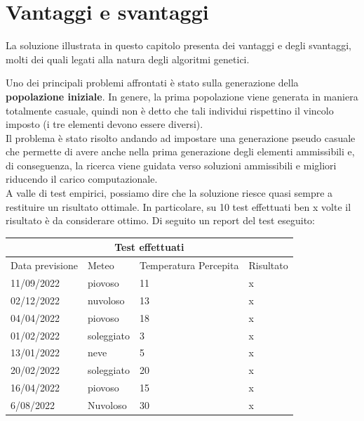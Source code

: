 \documentclass[a4paper, 11pt, oneside]{report}
\begin{document}
            \section{Vantaggi e svantaggi}
            La soluzione illustrata in questo capitolo presenta dei vantaggi e degli svantaggi, molti dei quali legati
            alla natura degli algoritmi genetici.
            \par \noindent Uno dei principali problemi affrontati è stato sulla generazione della \textbf{popolazione iniziale}.
            In genere, la prima popolazione viene generata in maniera totalmente casuale, quindi non è detto che
            tali individui rispettino il vincolo imposto (i tre elementi devono essere diversi).\\
            Il problema è stato risolto andando ad impostare una generazione pseudo casuale che permette
            di avere anche nella prima generazione degli elementi ammissibili e, di conseguenza,
            la ricerca viene guidata verso soluzioni ammissibili e migliori riducendo il carico computazionale.\\
            A valle di test empirici, possiamo dire che la soluzione riesce quasi sempre a restituire un risultato ottimale.
            In particolare, su 10 test effettuati ben x volte il risultato è da considerare ottimo.
            Di seguito un report del test eseguito:
            \begin{center}
                \begin{tabular}{ |p{3cm}|p{2cm}|p{2cm}||p{4cm}|}
                    \hline
                    \multicolumn{4}{|c|}{Test effettuati} \\
                    \hline
                    Data previsione & Meteo & Temperatura Percepita & Risultato\\
                    \hline
                    11/09/2022 & piovoso  & 11 & x\\
                    \hline
                    02/12/2022 & nuvoloso  & 13 & x\\
                    \hline
                    04/04/2022 & piovoso  & 18 & x\\
                    \hline
                    01/02/2022 & soleggiato  & 3 & x\\
                    \hline
                    13/01/2022 & neve  & 5 & x\\
                    \hline
                    20/02/2022 & soleggiato  & 20 & x\\
                    \hline
                    16/04/2022 & piovoso  & 15 & x\\
                    \hline
                    6/08/2022 & Nuvoloso  & 30 & x\\
                    \hline
                \end{tabular}
            \end{center}
\end{document}
